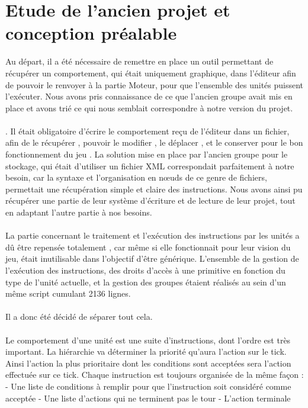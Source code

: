 \documentclass{report}
\begin{document}
\section{Etude de l'ancien projet et conception préalable}

Au départ, il a été nécessaire de remettre en place un outil permettant de récupérer un comportement, qui était uniquement graphique, dans l'éditeur afin de pouvoir le renvoyer à la partie Moteur, pour que l'ensemble des unités puissent l'exécuter.
Nous avons pris connaissance de ce que l'ancien groupe avait mis en place et avons trié ce qui nous semblait correspondre à notre version du projet.
\paragraph{}
.
Il était obligatoire d'écrire le comportement reçu de l'éditeur dans un fichier, afin de le récupérer , pouvoir le modifier , le déplacer , et le conserver pour le bon fonctionnement du jeu .
La solution mise en place par l'ancien groupe pour le stockage, qui était d'utiliser un fichier XML correspondait parfaitement à notre besoin, car la syntaxe et l'organisation en nœuds de ce genre de fichiers, permettait une récupération simple et claire des instructions. Nous avons ainsi pu récupérer une partie de leur système d'écriture et de lecture de leur projet, tout en adaptant l'autre partie à nos besoins.
\paragraph{}
La partie concernant le traitement et l'exécution des instructions par les unités a dû être repensée totalement , car même si elle fonctionnait pour leur vision du jeu, était inutilisable dans l’objectif d’être générique. 
L’ensemble de la gestion de l'exécution des instructions, des droits d’accès à une primitive en fonction du type de l’unité actuelle, et la gestion des groupes étaient réalisés au sein d’un même script cumulant 2136 lignes.
\paragraph{}
Il a donc été décidé de séparer tout cela.
\paragraph{}
Le comportement d'une unité est une suite d'instructions, dont l'ordre est très important. La hiérarchie va déterminer la priorité qu'aura l'action sur le tick. Ainsi l'action la plus prioritaire dont les conditions sont acceptées sera l'action effectuée sur ce tick.
Chaque instruction est toujours organisée de la même façon :
- Une liste de conditions à remplir pour que l'instruction soit considéré comme acceptée\newline
- Une liste d'actions qui ne terminent pas le tour\newline
- L'action terminale\newline
\end{document}

